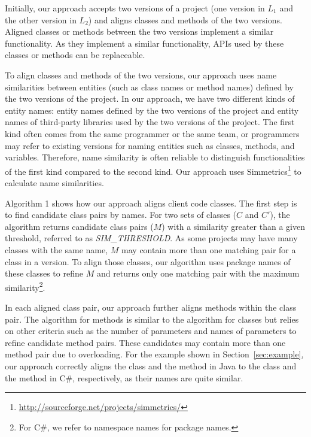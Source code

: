 Initially, our approach accepts two versions of a project (one version in
$L_1$ and the other version in $L_2$) and aligns classes and methods
of the two versions. Aligned classes or methods
between the two versions implement a similar functionality. As they
implement a similar functionality, APIs used by these classes or methods can be
replaceable.

To align classes and methods of the two versions, our approach uses
name similarities between entities (such as class names or method names)
defined by the two versions of the project. In our approach, we have two
different kinds of entity names: entity names defined by the two versions
of the project and entity names of third-party libraries used by the two versions of the project.
The first kind often comes from the same programmer or the same team, or
programmers may refer to existing versions for naming entities such
as classes, methods, and variables. Therefore, name similarity is often
reliable to distinguish functionalities of the first kind compared to the second
kind. Our approach uses Simmetrics\footnote{\url{http://sourceforge.net/projects/simmetrics/}}
to calculate name similarities.

Algorithm 1 shows how our approach aligns client code classes. The
first step is to find candidate class pairs by names. For two sets
of classes ($C$ and $C'$), the algorithm returns candidate class
pairs ($M$) with a similarity greater than a given threshold,
referred to as \emph{SIM\_THRESHOLD}. As some projects may have many
classes with the same name, $M$ may contain more than one matching
pair for a class in a version. To align those classes, our algorithm
uses package names of these classes to refine $M$ and returns only
one matching pair with the maximum similarity\footnote{For C\#, we
refer to namespace names for package names.}.

In each aligned class pair, our approach further aligns methods
within the class pair. The algorithm for methods is similar to the
algorithm for classes but relies on other criteria such as the number of parameters
and names of parameters to refine candidate method pairs. These candidates
may contain more than one method pair due to overloading.
For the example shown in Section~\ref{sec:example}, our approach
correctly aligns the class  and the method
 in Java to the class 
and the method  in C\#, respectively, as their names are quite
similar.
